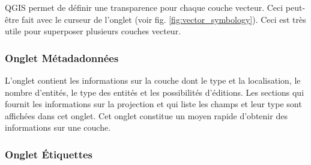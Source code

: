  \label{sec:vect_transparency} 
QGIS \CURRENT permet de d\'efinir une transparence pour chaque couche vecteur. Ceci peut-\^etre fait avec le curseur  de l'onglet  (voir fig. \ref{fig:vector_symbology}). Ceci est tr\`es utile pour superposer plusieurs couches vecteur.

\subsubsection{Onglet M\'etadadonn\'ees}

L'onglet  contient les informations sur la couche dont le type et la localisation, le nombre d'entit\'es, le type des entit\'es et les possibilit\'es d'\'editions. Les sections  qui fournit les informations sur la projection et  qui liste les champs et leur type sont affich\'ees dans cet onglet. Cet onglet constitue un moyen rapide d'obtenir des informations sur une couche.

\subsubsection{Onglet \'Etiquettes}

